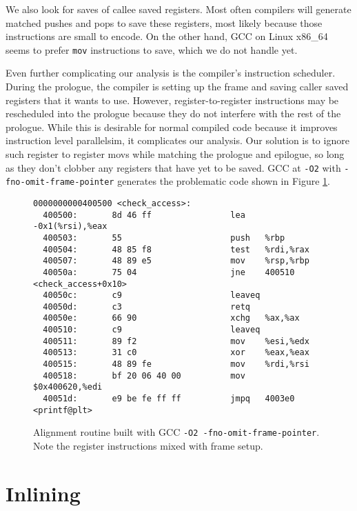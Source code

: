 We also look for saves of callee saved registers.  Most often compilers will
generate matched pushes and pops to save these registers, most likely because
those instructions are small to encode.  On the other hand, GCC on Linux x86\_64
seems to prefer {\tt mov} instructions to save, which we do not handle yet.

Even further complicating our analysis is the compiler's instruction scheduler.
During the prologue, the compiler is setting up the frame and saving caller
saved registers that it wants to use.  However, register-to-register
instructions may be rescheduled into the prologue because they do not interfere
with the rest of the prologue.  While this is desirable for normal compiled code
because it improves instruction level parallelsim, it complicates our analysis.
Our solution is to ignore such register to register movs while matching the
prologue and epilogue, so long as they don't clobber any registers that have yet
to be saved.  GCC at {\tt -O2} with {\tt -fno-omit-frame-pointer} generates the
problematic code shown in Figure \ref{fig:scheduled_prologue}.

\begin{figure}
\begin{verbatim}
0000000000400500 <check_access>:
  400500:       8d 46 ff                lea    -0x1(%rsi),%eax
  400503:       55                      push   %rbp
  400504:       48 85 f8                test   %rdi,%rax
  400507:       48 89 e5                mov    %rsp,%rbp
  40050a:       75 04                   jne    400510 <check_access+0x10>
  40050c:       c9                      leaveq 
  40050d:       c3                      retq   
  40050e:       66 90                   xchg   %ax,%ax
  400510:       c9                      leaveq 
  400511:       89 f2                   mov    %esi,%edx
  400513:       31 c0                   xor    %eax,%eax
  400515:       48 89 fe                mov    %rdi,%rsi
  400518:       bf 20 06 40 00          mov    $0x400620,%edi
  40051d:       e9 be fe ff ff          jmpq   4003e0 <printf@plt>
\end{verbatim}
\caption{Alignment routine built with GCC {\tt -O2 -fno-omit-frame-pointer}.
Note the register instructions mixed with frame setup.}
\label{fig:scheduled_prologue}
\end{figure}

\section{Inlining}

